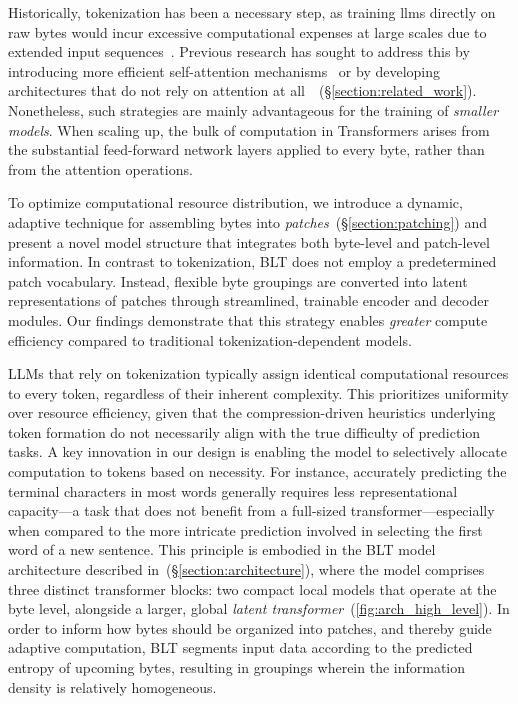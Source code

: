 Historically, tokenization has been a necessary step, as training llms directly on raw bytes would incur excessive computational expenses at large scales due to extended input sequences~\citep{xue2022byt5}. Previous research has sought to address this by introducing more efficient self-attention mechanisms~\citep{el2020characterbert, clark2022canine} or by developing architectures that do not rely on attention at all~\citep{wang2024mambabyte}~(\S\ref{section:related_work}). Nonetheless, such strategies are mainly advantageous for the training of \textit{smaller models}. When scaling up, the bulk of computation in Transformers arises from the substantial feed-forward network layers applied to every byte, rather than from the attention operations.

To optimize computational resource distribution, we introduce a dynamic, adaptive technique for assembling bytes into \textit{patches}~(\S\ref{section:patching}) and present a novel model structure that integrates both byte-level and patch-level information. In contrast to tokenization, {\textsc BLT} does not employ a predetermined patch vocabulary. Instead, flexible byte groupings are converted into latent representations of patches through streamlined, trainable encoder and decoder modules. Our findings demonstrate that this strategy enables \textit{greater} compute efficiency compared to traditional tokenization-dependent models.

LLMs that rely on tokenization typically assign identical computational resources to every token, regardless of their inherent complexity. This prioritizes uniformity over resource efficiency, given that the compression-driven heuristics underlying token formation do not necessarily align with the true difficulty of prediction tasks. A key innovation in our design is enabling the model to selectively allocate computation to tokens based on necessity. For instance, accurately predicting the terminal characters in most words generally requires less representational capacity—a task that does not benefit from a full-sized transformer—especially when compared to the more intricate prediction involved in selecting the first word of a new sentence. This principle is embodied in the {\textsc BLT} model architecture described in~(\S\ref{section:architecture}), where the model comprises three distinct transformer blocks: two compact local models that operate at the byte level, alongside a larger, global \textit{latent transformer}~(\autoref{fig:arch_high_level}).
In order to inform how bytes should be organized into patches, and thereby guide adaptive computation, {\textsc BLT} segments input data according to the predicted entropy of upcoming bytes, resulting in groupings wherein the information density is relatively homogeneous.

